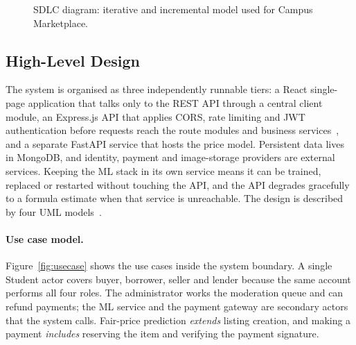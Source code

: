 \documentclass[12pt,letterpaper,twoside,openany]{report}
\begin{document}
\begin{figure}[h]
\caption{SDLC diagram: iterative and incremental model used for Campus Marketplace.}\label{fig:sdlc}
\end{figure}

\subsection{High-Level Design}
The system is organised as three independently runnable tiers: a React single-page application that
talks only to the REST API through a central client module, an Express.js API that applies CORS, rate
limiting and JWT authentication before requests reach the route modules and business
services~\cite{fielding}, and a separate FastAPI service that hosts the price model. Persistent data lives
in MongoDB, and identity, payment and image-storage providers are external services. Keeping the ML stack
in its own service means it can be trained, replaced or restarted without touching the API, and the API
degrades gracefully to a formula estimate when that service is unreachable. The design is described by
four UML models~\cite{uml}.

\paragraph{Use case model.} Figure~\ref{fig:usecase} shows the use cases inside the system boundary. A
single Student actor covers buyer, borrower, seller and lender because the same account performs all four
roles. The administrator works the moderation queue and can refund payments; the ML service and the
payment gateway are secondary actors that the system calls. Fair-price prediction \emph{extends} listing
creation, and making a payment \emph{includes} reserving the item and verifying the payment signature.
\end{document}
